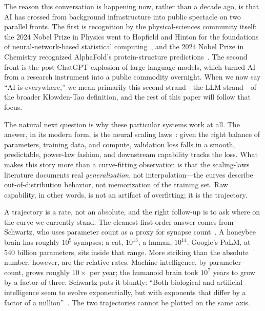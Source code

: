 \documentclass[11pt]{article}
\begin{document}
The reason this conversation is happening now, rather than a decade ago, is that AI has crossed from background infrastructure into public spectacle on two parallel fronts. The first is recognition by the physical-sciences community itself: the 2024 Nobel Prize in Physics went to Hopfield and Hinton for the foundations of neural-network-based statistical computing~\cite{hopfield1982}, and the 2024 Nobel Prize in Chemistry recognized AlphaFold's protein-structure predictions~\cite{jumper2021alphafold}. The second front is the post-ChatGPT explosion of large language models, which turned AI from a research instrument into a public commodity overnight. When we now say ``AI is everywhere,'' we mean primarily this second strand---the LLM strand---of the broader Klowden-Tao definition, and the rest of this paper will follow that focus.

The natural next question is why these particular systems work at all. The answer, in its modern form, is the neural scaling laws~\cite{kaplan2020scaling,hoffmann2022chinchilla}: given the right balance of parameters, training data, and compute, validation loss falls in a smooth, predictable, power-law fashion, and downstream capability tracks the loss. What makes this story more than a curve-fitting observation is that the scaling-laws literature documents real \emph{generalization}, not interpolation---the curves describe out-of-distribution behavior, not memorization of the training set. Raw capability, in other words, is not an artifact of overfitting; it is the trajectory.

A trajectory is a rate, not an absolute, and the right follow-up is to ask where on the curve we currently stand. The cleanest first-order answer comes from Schwartz, who uses parameter count as a proxy for synapse count~\cite{schwartz2022interpretable}. A honeybee brain has roughly $10^9$ synapses; a cat, $10^{13}$; a human, $10^{14}$. Google's PaLM, at 540 billion parameters, sits inside that range. More striking than the absolute number, however, are the relative rates. Machine intelligence, by parameter count, grows roughly $10\times$ per year; the humanoid brain took $10^7$ years to grow by a factor of three. Schwartz puts it bluntly: ``Both biological and artificial intelligence seem to evolve exponentially, but with exponents that differ by a factor of a million''~\cite{schwartz2022interpretable}. The two trajectories cannot be plotted on the same axis.
\end{document}
